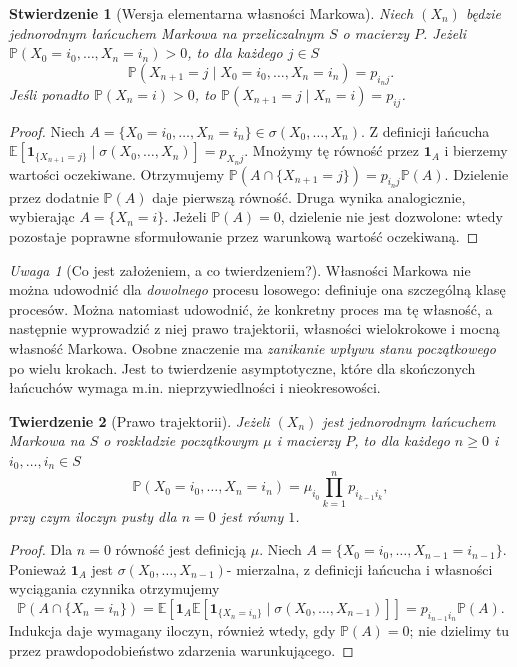 \documentclass[11pt,a4paper,oneside]{report}
\numberwithin{equation}{chapter}
\theoremstyle{plain}
\newtheorem{twierdzenie}{Twierdzenie}[chapter]
\newtheorem{stwierdzenie}[twierdzenie]{Stwierdzenie}
\theoremstyle{definition}
\theoremstyle{remark}
\newtheorem{uwaga}{Uwaga}[chapter]
\newcommand{\Prob}{\mathbb{P}}
\newcommand{\E}{\mathbb{E}}
\newcommand{\ind}[1]{\mathbf{1}_{#1}}
\begin{document}
\begin{stwierdzenie}[Wersja elementarna własności Markowa]
Niech $(X_n)$ będzie jednorodnym łańcuchem Markowa
na przeliczalnym $S$ o macierzy $P$. Jeżeli
$\Prob(X_0=i_0,\ldots,X_n=i_n)>0$, to dla każdego $j\in S$
\[
\Prob(X_{n+1}=j\mid X_0=i_0,\ldots,X_n=i_n)=p_{i_nj}.
\]
Jeśli ponadto $\Prob(X_n=i)>0$, to
$\Prob(X_{n+1}=j\mid X_n=i)=p_{ij}$.
\end{stwierdzenie}
\begin{proof}
Niech $A=\{X_0=i_0,\ldots,X_n=i_n\}\in
\sigma(X_0,\ldots,X_n)$. Z definicji łańcucha
$\E[\ind{\{X_{n+1}=j\}}\mid
\sigma(X_0,\ldots,X_n)]=p_{X_nj}$.
Mnożymy tę równość przez $\ind A$ i bierzemy
wartości oczekiwane. Otrzymujemy
$\Prob(A\cap\{X_{n+1}=j\})=p_{i_nj}\Prob(A)$.
Dzielenie przez dodatnie $\Prob(A)$ daje pierwszą
równość. Druga wynika analogicznie, wybierając
$A=\{X_n=i\}$. Jeżeli $\Prob(A)=0$, dzielenie
nie jest dozwolone: wtedy pozostaje poprawne
sformułowanie przez warunkową wartość oczekiwaną.
\end{proof}

\begin{uwaga}[Co jest założeniem, a co twierdzeniem?]
Własności Markowa nie można udowodnić dla \emph{dowolnego}
procesu losowego: definiuje ona szczególną klasę procesów.
Można natomiast udowodnić, że konkretny proces ma tę własność,
a następnie wyprowadzić z niej prawo trajektorii,
własności wielokrokowe i mocną własność Markowa.
Osobne znaczenie ma \emph{zanikanie wpływu stanu początkowego}
po wielu krokach. Jest to twierdzenie asymptotyczne,
które dla skończonych łańcuchów wymaga m.in.
nieprzywiedlności i nieokresowości.
\end{uwaga}

\begin{twierdzenie}[Prawo trajektorii]
Jeżeli $(X_n)$ jest jednorodnym łańcuchem Markowa
na $S$ o rozkładzie początkowym $\mu$ i macierzy $P$,
to dla każdego $n\geq0$ i $i_0,\ldots,i_n\in S$
\[
\Prob(X_0=i_0,\ldots,X_n=i_n)
=\mu_{i_0}\prod_{k=1}^n p_{i_{k-1}i_k},
\]
przy czym iloczyn pusty dla $n=0$ jest równy $1$.
\end{twierdzenie}
\begin{proof}
Dla $n=0$ równość jest definicją $\mu$.
Niech $A=\{X_0=i_0,\ldots,X_{n-1}=i_{n-1}\}$.
Ponieważ $\ind A$ jest $\sigma(X_0,\ldots,X_{n-1})$-
mierzalna, z definicji łańcucha i własności
wyciągania czynnika otrzymujemy
\[
\Prob(A\cap\{X_n=i_n\})
=\E\left[\ind A\E[\ind{\{X_n=i_n\}}
\mid\sigma(X_0,\ldots,X_{n-1})]\right]
=p_{i_{n-1}i_n}\Prob(A).
\]
Indukcja daje wymagany iloczyn, również wtedy,
gdy $\Prob(A)=0$; nie dzielimy tu przez
prawdopodobieństwo zdarzenia warunkującego.
\end{proof}
\end{document}
